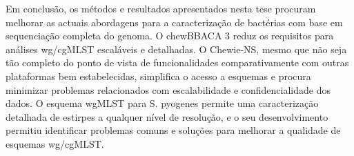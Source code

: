 Em conclusão, os métodos e resultados apresentados nesta tese procuram melhorar as actuais abordagens para a caracterização de bactérias com base em sequenciação completa do genoma. O chewBBACA 3 reduz os requisitos para análises wg/cgMLST escaláveis e detalhadas. O Chewie-NS, mesmo que não seja tão completo do ponto de vista de funcionalidades comparativamente com outras plataformas bem estabelecidas, simplifica o acesso a esquemas e procura minimizar problemas relacionados com escalabilidade e confidencialidade dos dados. O esquema wgMLST para S. pyogenes permite uma caracterização detalhada de estirpes a qualquer nível de resolução, e o seu desenvolvimento permitiu identificar problemas comuns e soluções para melhorar a qualidade de esquemas wg/cgMLST.


